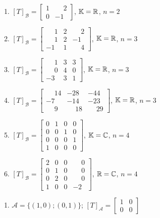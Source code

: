 \documentclass[12pt]{exam}
\begin{document}
\begin{exercicio}
\begin{enumerate}[label=({\alph*})]
    \item $[T]_\mathcal{B} = \begin{bmatrix} 1 & \phantom{-} 2\\ 0 & -1\end{bmatrix}$, $\mathbb{K} = \mathbb{R}$, $n = 2$
    \item $[T]_\mathcal{B} = \begin{bmatrix} \phantom{-} 1 & 2 & \phantom{-} 2\\ \phantom{-} 1 & 2 & -1\\ -1 & 1 & \phantom{-} 4\end{bmatrix}$, $\mathbb{K} = \mathbb{R}$, $n = 3$
    \item $[T]_\mathcal{B} = \begin{bmatrix} \phantom{-} 1 & 3 & 3\\ \phantom{-} 0 & 4 & 0\\ -3 & 3 & 1\end{bmatrix}$, $\mathbb{K} = \mathbb{R}$, $n = 3$
    \item $[T]_\mathcal{B} = \begin{bmatrix} \phantom{-} 14 & -28 & -44\\ -7 & -14 & -23\\ \phantom{-} 9 & \phantom{-} 18 & \phantom{-} 29\end{bmatrix}$, $\mathbb{K} = \mathbb{R}$, $n = 3$
    \item $[T]_\mathcal{B} = \begin{bmatrix} 0 & 1 & 0 & 0\\ 0 & 0 & 1 & 0\\ 0 & 0 & 0 & 1 \\ 1 & 0 & 0 & 0\end{bmatrix}$, $\mathbb{K} = \mathbb{C}$, $n = 4$
    \item $[T]_\mathcal{B} = \begin{bmatrix} 2 & 0 & 0 & \phantom{-}0\\ 0 & 1 & 0 & \phantom{-}0\\ 0 & 2 & 0 & \phantom{-}0 \\ 1 & 0 & 0 & -2\end{bmatrix}$, $\mathbb{R} = \mathbb{C}$, $n = 4$
  \end{enumerate}
  \begin{solucao}
      \begin{enumerate}[label=({\alph*})]
          \item $\mathcal{A} = \{(1,0);(0,1)\}$; $[T]_\mathcal{A} = \begin{bmatrix} 1 & 0\\ 0 & 0\end{bmatrix}$

\end{enumerate}
\end{solucao}
\end{exercicio}
\end{document}
